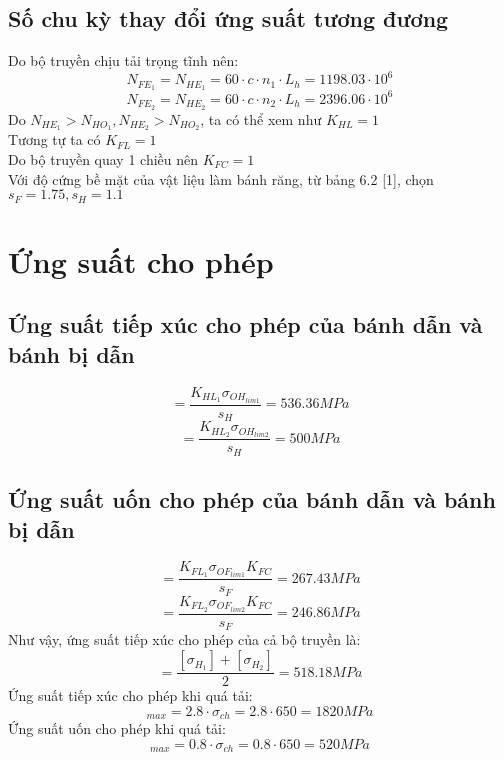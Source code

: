\subsection{Số chu kỳ thay đổi ứng suất tương đương}
Do bộ truyền chịu tải trọng tĩnh nên: 
\begin{equation}
    N_{FE_1} = N_{HE_1} = 60\cdot c \cdot n_1 \cdot L_h = 1198.03\cdot 10^6
\end{equation}
\begin{equation}
    N_{FE_2} = N_{HE_2} = 60\cdot c \cdot n_2 \cdot L_h = 2396.06\cdot 10^6
\end{equation}
Do $N_{HE_1} > N_{HO_1}, N_{HE_2} > N_{HO_2}$, ta có thể xem như $K_{HL} = 1$ \\
Tương tự ta có $K_{FL} = 1$ \\
Do bộ truyền quay 1 chiều nên $K_{FC} = 1$ \\
Với độ cứng bề mặt của vật liệu làm bánh răng, từ bảng 6.2 [1], chọn $s_F=1.75, s_H=1.1$ \\
\section{Ứng suất cho phép}
\subsection{Ứng suất tiếp xúc cho phép của bánh dẫn và bánh bị dẫn}
\begin{equation}
    [\sigma_{H_1}] = \frac{K_{HL_1}\sigma_{OH_{lim1}}}{s_H} = 536.36MPa
\end{equation}
\begin{equation}
    [\sigma_{H_2}] = \frac{K_{HL_2}\sigma_{OH_{lim2}}}{s_H} = 500MPa
\end{equation}
\subsection{Ứng suất uốn cho phép của bánh dẫn và bánh bị dẫn}
\begin{equation}
    [\sigma_{F_1}] = \frac{K_{FL_1}\sigma_{OF_{lim1}}K_{FC}}{s_F} = 267.43MPa
\end{equation}
\begin{equation}
    [\sigma_{F_2}] = \frac{K_{FL_2}\sigma_{OF_{lim2}}K_{FC}}{s_F} = 246.86MPa
\end{equation}
Như vậy, ứng suất tiếp xúc cho phép của cả bộ truyền là:
\begin{equation}
    [\sigma_H] = \frac{[\sigma_{H_1}] + [\sigma_{H_2}]}{2} = 518.18MPa 
\end{equation}
Ứng suất tiếp xúc cho phép khi quá tải:
\begin{equation}
    [\sigma_H]_{max} = 2.8 \cdot \sigma_{ch} = 2.8 \cdot 650 = 1820MPa
\end{equation}
Ứng suất uốn cho phép khi quá tải:
\begin{equation}
    [\sigma_F]_{max} = 0.8 \cdot \sigma_{ch} = 0.8 \cdot 650 = 520MPa
\end{equation}


